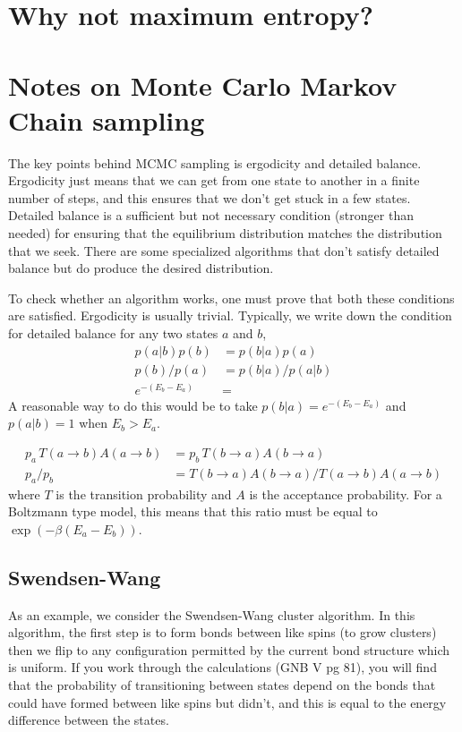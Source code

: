 \documentclass[aps,prl,twocolumn]{revtex4-1}
\begin{document}
\section{Why not maximum entropy?}

\appendix

\section{Notes on Monte Carlo Markov Chain sampling}
The key points behind MCMC sampling is ergodicity and detailed balance. Ergodicity just means that we can get from one state to another in a finite number of steps, and this ensures that we don't get stuck in a few states. Detailed balance is a sufficient but not necessary condition (stronger than needed) for ensuring that the equilibrium distribution matches the distribution that we seek. There are some specialized algorithms that don't satisfy detailed balance but do produce the desired distribution.

To check whether an algorithm works, one must prove that both these conditions are satisfied. Ergodicity is usually trivial. Typically, we write down the condition for detailed balance for any two states $a$ and $b$,
\begin{align}
	p(a|b)p(b) &= p(b|a)p(a) \\
	p(b)/p(a) &= p(b|a)/p(a|b) \\
	e^{-(E_b-E_a)} &= 
\end{align}
A reasonable way to do this would be to take $p(b|a) = e^{-(E_b-E_a)}$ and $p(a|b) = 1$ when $E_b>E_a$.

\begin{align}
	p_a\,T(a\rightarrow b)A(a\rightarrow b) &= p_b\,T(b\rightarrow a)A(b\rightarrow a)\\
	p_a/p_b &= T(b\rightarrow a)A(b\rightarrow a)/T(a\rightarrow b)A(a\rightarrow b)
\end{align}
where $T$ is the transition probability and $A$ is the acceptance probability. For a Boltzmann type model, this means that this ratio must be equal to $\exp(-\beta(E_a-E_b))$.

\subsection{Swendsen-Wang}
As an example, we consider the Swendsen-Wang cluster algorithm. In this algorithm, the first step is to form bonds between like spins (to grow clusters) then we flip to any configuration permitted by the current bond structure which is uniform. If you work through the calculations (GNB V pg 81), you will find that the probability of transitioning between states depend on the bonds that could have formed between like spins but didn't, and this is equal to the energy difference between the states.
\end{document}
